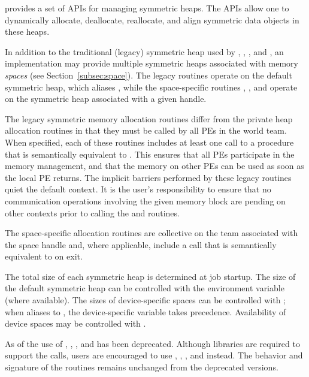 \openshmem provides a set of \acp{API} for managing symmetric heaps. The
\acp{API} allow one to dynamically allocate, deallocate, reallocate, and align
symmetric data objects in these heaps.

In addition to the traditional (legacy) symmetric heap used by
, , , and
, an implementation may provide multiple symmetric heaps
associated with memory \emph{spaces} (see Section~\ref{subsec:space}). The
legacy routines operate on the default symmetric heap, which aliases
, while the space-specific routines
, , and
 operate on the symmetric heap associated with a
given  handle.

The legacy symmetric memory allocation routines differ from the private heap
allocation routines in that they must be called by all \acp{PE} in
the world team.  When specified, each of these routines includes at
least one call to a procedure that is semantically equivalent to
.  This ensures that all \acp{PE}
participate in the memory management, and that the memory on other
\acp{PE} can be used as soon as the local \ac{PE} returns.  The
implicit barriers performed by these legacy routines quiet the default
context.  It is the user's responsibility to ensure that no
communication operations involving the given memory block are pending
on other contexts prior to calling the  and
 routines.

The space-specific allocation routines are collective on the team
associated with the space handle and, where applicable, include a call
that is semantically equivalent to  on exit.

The total size of each symmetric heap is determined at job startup. The size of
the default symmetric heap can be controlled with the
 environment variable (where available). The
sizes of device-specific spaces can be controlled with
; when
 aliases to
, the device-specific variable takes
precedence. Availability of device spaces may be controlled with
.

\begin{DeprecateBlock}
  As of \openshmem[1.2] the use of , ,
  ,  and  has been deprecated. Although \openshmem
  libraries are required to support the calls, users are encouraged to use
  , , , and
   instead.  The behavior and signature  of the routines
  remains unchanged from the deprecated versions.
\end{DeprecateBlock}

